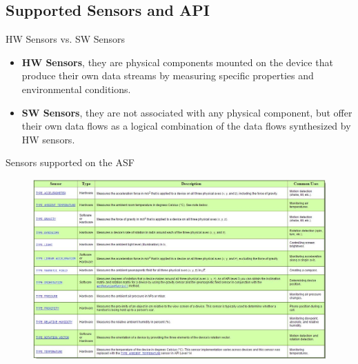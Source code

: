 \documentclass{beamer}
\begin{document}
\subsection{Supported Sensors and API}

  \begin{frame}{HW Sensors vs. SW Sensors}
    \begin{itemize}\itemsep20pt
      \item \textbf{HW Sensors}, they are physical components mounted on the
      device that produce their own data streams by measuring specific
      properties and environmental conditions.
      \item \textbf{SW Sensors}, they are not associated with any physical
      component, but offer their own data flows as a logical combination of the
      data flows synthesized by HW sensors.
    \end{itemize}
  \end{frame}

  \begin{frame}{Sensors supported on the ASF}
    \begin{figure}
      \includegraphics[width=0.99\linewidth]{figures/sensor-table}
    \end{figure}
  \end{frame}
\end{document}
